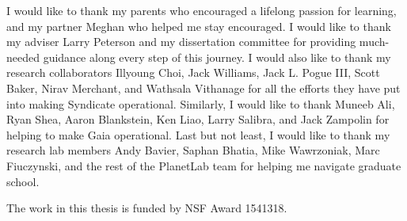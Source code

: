 I would like to thank my parents who encouraged a lifelong passion for learning,
and my partner Meghan who helped me stay encouraged.
I would like to thank my adviser Larry Peterson and my dissertation
committee for providing much-needed guidance along every step of this journey.
I would also like to thank my research collaborators Illyoung Choi, Jack Williams,
Jack L. Pogue III, Scott Baker, Nirav Merchant, and Wathsala Vithanage for all the efforts they have
put into making Syndicate operational.  Similarly, I would like to thank Muneeb
Ali, Ryan Shea, Aaron Blankstein, Ken Liao, Larry Salibra, and Jack Zampolin for
helping to make Gaia operational.  Last but not least,
I would like to thank my research lab members Andy Bavier, Saphan Bhatia, Mike
Wawrzoniak, Marc Fiuczynski, and the rest of the PlanetLab team for helping me
navigate graduate school.

The work in this thesis is funded by NSF Award 1541318.
